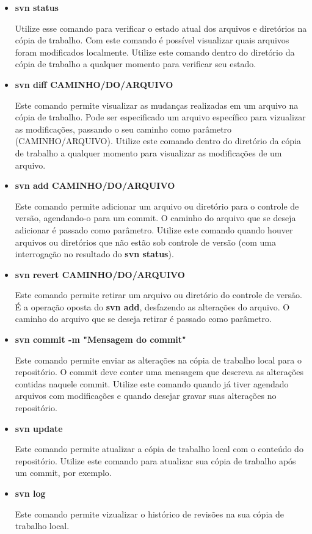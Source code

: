 \begin{itemize}
 \item 
    \textbf{svn status}
  

    \subitem Utilize esse comando para verificar o estado atual dos arquivos e diretórios na cópia de trabalho.
       Com este comando é possível visualizar quais arquivos foram modificados localmente.
       Utilize este comando dentro do diretório da cópia de trabalho a qualquer momento para verificar seu estado.


\item 
    \textbf{svn diff CAMINHO/DO/ARQUIVO}
  

    \subitem Este comando permite visualizar as mudanças realizadas em um arquivo na cópia de trabalho.
       Pode ser especificado um arquivo específico para vizualizar as modificações, passando o seu caminho como
       parâmetro (CAMINHO/ARQUIVO).
       Utilize este comando dentro do diretório da cópia de trabalho a qualquer momento para visualizar as modificações
       de um arquivo.

\item 
    \textbf{svn add CAMINHO/DO/ARQUIVO}
  

    \subitem Este comando permite adicionar um arquivo ou diretório para o controle de versão, agendando-o para um commit.
       O caminho do arquivo que se deseja adicionar é passado como parâmetro.
       Utilize este comando quando houver arquivos ou diretórios que não estão sob controle de versão
       (com uma interrogação no resultado do \textbf{svn status}).

\item 
    \textbf{svn revert CAMINHO/DO/ARQUIVO}
  

    \subitem Este comando permite retirar um arquivo ou diretório do controle de versão.
       É a operação oposta do \textbf{svn add}, desfazendo as alterações do arquivo.
       O caminho do arquivo que se deseja retirar é passado como parâmetro.

\item 
    \textbf{svn commit -m "Mensagem do commit"}
  

    \subitem Este comando permite enviar as alterações na cópia de trabalho local para o repositório.
       O commit deve conter uma mensagem que descreva as alterações contidas naquele commit.
       Utilize este comando quando já tiver agendado arquivos com modificações e quando desejar
       gravar suas alterações no repositório.

\item 
    \textbf{svn update}
  

    \subitem Este comando permite atualizar a cópia de trabalho local com o conteúdo do repositório.
       Utilize este comando para atualizar sua cópia de trabalho após um commit, por exemplo.

\item 
  \label{comando_log}
    \textbf{svn log}
  
    \subitem Este comando permite vizualizar o histórico de revisões na sua cópia de trabalho local.

\end{itemize}

